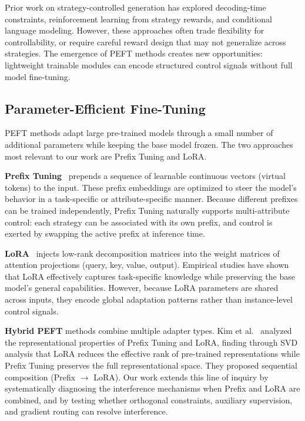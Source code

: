\documentclass[conference]{IEEEtran}
\begin{document}
Prior work on strategy-controlled generation has explored decoding-time constraints, reinforcement learning from strategy rewards, and conditional language modeling. However, these approaches often trade flexibility for controllability, or require careful reward design that may not generalize across strategies. The emergence of PEFT methods creates new opportunities: lightweight trainable modules can encode structured control signals without full model fine-tuning.

\subsection{Parameter-Efficient Fine-Tuning}

PEFT methods adapt large pre-trained models through a small number of additional parameters while keeping the base model frozen. The two approaches most relevant to our work are Prefix Tuning and LoRA.

\textbf{Prefix Tuning}~\cite{li2021prefix} prepends a sequence of learnable continuous vectors (virtual tokens) to the input. These prefix embeddings are optimized to steer the model's behavior in a task-specific or attribute-specific manner. Because different prefixes can be trained independently, Prefix Tuning naturally supports multi-attribute control: each strategy can be associated with its own prefix, and control is exerted by swapping the active prefix at inference time.

\textbf{LoRA}~\cite{hu2021lora} injects low-rank decomposition matrices into the weight matrices of attention projections (query, key, value, output). Empirical studies have shown that LoRA effectively captures task-specific knowledge while preserving the base model's general capabilities. However, because LoRA parameters are shared across inputs, they encode global adaptation patterns rather than instance-level control signals.

\textbf{Hybrid PEFT} methods combine multiple adapter types. Kim et al.~\cite{kim2024peft} analyzed the representational properties of Prefix Tuning and LoRA, finding through SVD analysis that LoRA reduces the effective rank of pre-trained representations while Prefix Tuning preserves the full representational space. They proposed sequential composition (Prefix $\rightarrow$ LoRA). Our work extends this line of inquiry by systematically diagnosing the interference mechanisms when Prefix and LoRA are combined, and by testing whether orthogonal constraints, auxiliary supervision, and gradient routing can resolve interference.
\end{document}
